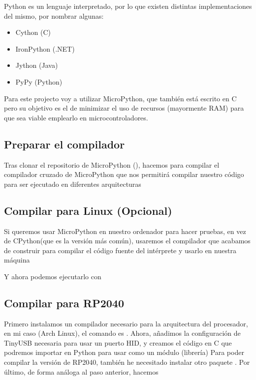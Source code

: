 Python es un lenguaje interpretado, por lo que existen distintas implementaciones del mismo, por nombrar algunas: 
\begin{itemize}
  \item Cython (C)
  \item IronPython (.NET)
  \item Jython (Java)
  \item PyPy (Python)
\end{itemize}
Para este projecto voy a utilizar MicroPython, que también está escrito en C pero su objetivo es el de minimizar el uso de recursos (mayormente RAM) para que sea viable emplearlo en microcontroladores.

\subsection{Preparar el compilador}
Tras clonar el repositorio de MicroPython (), hacemos  para compilar el compilador cruzado de MicroPython que nos permitirá compilar nuestro código para ser ejecutado en diferentes arquitecturas

\subsection{Compilar para Linux (Opcional)}
Si queremos usar MicroPython en nuestro ordenador para hacer pruebas, en vez de CPython(que es la versión más común), usaremos el compilador que acabamos de construir para compilar el código fuente del intérprete y usarlo en nuestra máquina 

Y ahora podemos ejecutarlo con 

\subsection{Compilar para RP2040}
Primero instalamos un compilador necesario para la arquitectura del procesador, en mi caso (Arch Linux), el comando es . \newline
Ahora, añadimos la configuración de TinyUSB necesaria para usar un puerto HID, y creamos el código en C que podremos importar en Python para usar como un módulo (librería) \textcite{tusb-rp2}
Para poder compilar la versión de RP2040, también he necesitado instalar otro paquete . Por último, de forma análoga al paso anterior, hacemos 
